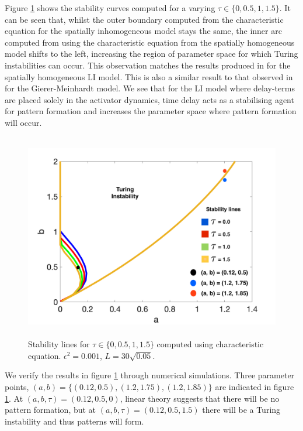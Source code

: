 Figure \ref{fig:tspacetau} shows the stability curves computed for a varying $\tau\in\{0,0.5,1,1.5\}$. It can be seen that, whilst the outer boundary computed from the characteristic equation for the spatially inhomogeneous model stays the same, the inner arc computed from using the characteristic equation from the spatially homogeneous model shifts to the left, increasing the region of parameter space for which Turing instabilities can occur. This observation matches the results produced in \cite{william} for the spatially homogeneous LI model. This is also a similar result to that observed in \cite{fadai} for the Gierer-Meinhardt model. We see that for the LI model where delay-terms are placed solely in the activator dynamics, time delay acts as a stabilising agent for pattern formation and increases the parameter space where pattern formation will occur.
\begin{figure}[H]
        \centering
        \includegraphics[width=12cm,height = 9cm]{tspacetau.png}
        \caption{Stability lines for $\tau\in\{0,0.5,1,1.5\}$ computed using characteristic equation. $\epsilon^2=0.001$, $L=30\sqrt{0.05}$.}
        \label{fig:tspacetau}
\end{figure}
We verify the results in figure \ref{fig:tspacetau} through numerical simulations. Three parameter points, $(a,b)=\{(0.12,0.5),(1.2,1.75),(1.2,1.85)\}$ are indicated in figure \ref{fig:tspacetau}. At $(a,b,\tau)=(0.12,0.5,0)$, linear theory suggests that there will be no pattern formation, but at $(a,b,\tau)=(0.12,0.5,1.5)$ there will be a Turing instability and thus patterns will form.
